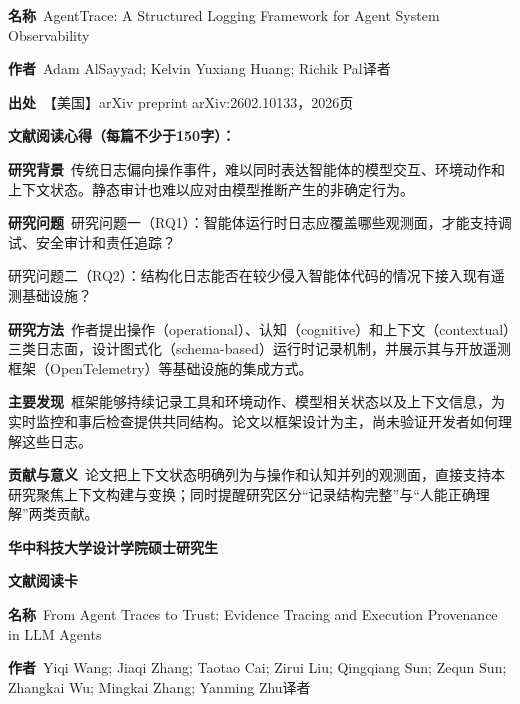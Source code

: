\noindent\textbf{名称}\ AgentTrace: A Structured Logging Framework for Agent System Observability\par
\noindent\textbf{作者}\ Adam AlSayyad; Kelvin Yuxiang Huang; Richik Pal\quad 译者\par
\noindent\textbf{出处}\ 【美国】arXiv preprint arXiv:2602.10133，2026\quad 页\par
\vspace{0.35em}
\noindent\textbf{文献阅读心得（每篇不少于150字）：}\par
\noindent\textbf{研究背景}\ 传统日志偏向操作事件，难以同时表达智能体的模型交互、环境动作和上下文状态。静态审计也难以应对由模型推断产生的非确定行为。\par
\noindent\textbf{研究问题}\ 研究问题一（RQ1）：智能体运行时日志应覆盖哪些观测面，才能支持调试、安全审计和责任追踪？\par
研究问题二（RQ2）：结构化日志能否在较少侵入智能体代码的情况下接入现有遥测基础设施？\par
\noindent\textbf{研究方法}\ 作者提出操作（operational）、认知（cognitive）和上下文（contextual）三类日志面，设计图式化（schema-based）运行时记录机制，并展示其与开放遥测框架（OpenTelemetry）等基础设施的集成方式。\par
\noindent\textbf{主要发现}\ 框架能够持续记录工具和环境动作、模型相关状态以及上下文信息，为实时监控和事后检查提供共同结构。论文以框架设计为主，尚未验证开发者如何理解这些日志。\par
\noindent\textbf{贡献与意义}\ 论文把上下文状态明确列为与操作和认知并列的观测面，直接支持本研究聚焦上下文构建与变换；同时提醒研究区分“记录结构完整”与“人能正确理解”两类贡献。\par
\clearpage
\begin{center}
{\songti\bfseries\fontsize{18.5pt}{27.75pt}\selectfont 华中科技大学设计学院硕士研究生\par}
{\songti\bfseries\fontsize{18.5pt}{27.75pt}\selectfont 文献阅读卡\par}
\end{center}
\vspace{0.25em}
\noindent\underline{}\par
\vspace{0.35em}
\noindent\textbf{名称}\ From Agent Traces to Trust: Evidence Tracing and Execution Provenance in LLM Agents\par
\noindent\textbf{作者}\ Yiqi Wang; Jiaqi Zhang; Taotao Cai; Zirui Liu; Qingqiang Sun; Zequn Sun; Zhangkai Wu; Mingkai Zhang; Yanming Zhu\quad 译者\par
